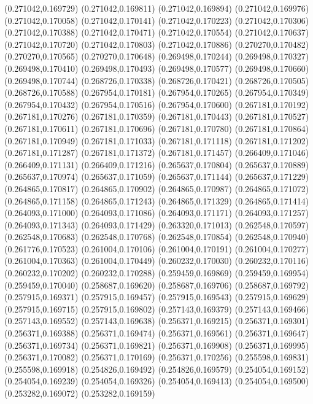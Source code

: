 (0.271042,0.169729)
(0.271042,0.169811)
(0.271042,0.169894)
(0.271042,0.169976)
(0.271042,0.170058)
(0.271042,0.170141)
(0.271042,0.170223)
(0.271042,0.170306)
(0.271042,0.170388)
(0.271042,0.170471)
(0.271042,0.170554)
(0.271042,0.170637)
(0.271042,0.170720)
(0.271042,0.170803)
(0.271042,0.170886)
(0.270270,0.170482)
(0.270270,0.170565)
(0.270270,0.170648)
(0.269498,0.170244)
(0.269498,0.170327)
(0.269498,0.170410)
(0.269498,0.170493)
(0.269498,0.170577)
(0.269498,0.170660)
(0.269498,0.170744)
(0.268726,0.170338)
(0.268726,0.170421)
(0.268726,0.170505)
(0.268726,0.170588)
(0.267954,0.170181)
(0.267954,0.170265)
(0.267954,0.170349)
(0.267954,0.170432)
(0.267954,0.170516)
(0.267954,0.170600)
(0.267181,0.170192)
(0.267181,0.170276)
(0.267181,0.170359)
(0.267181,0.170443)
(0.267181,0.170527)
(0.267181,0.170611)
(0.267181,0.170696)
(0.267181,0.170780)
(0.267181,0.170864)
(0.267181,0.170949)
(0.267181,0.171033)
(0.267181,0.171118)
(0.267181,0.171202)
(0.267181,0.171287)
(0.267181,0.171372)
(0.267181,0.171457)
(0.266409,0.171046)
(0.266409,0.171131)
(0.266409,0.171216)
(0.265637,0.170804)
(0.265637,0.170889)
(0.265637,0.170974)
(0.265637,0.171059)
(0.265637,0.171144)
(0.265637,0.171229)
(0.264865,0.170817)
(0.264865,0.170902)
(0.264865,0.170987)
(0.264865,0.171072)
(0.264865,0.171158)
(0.264865,0.171243)
(0.264865,0.171329)
(0.264865,0.171414)
(0.264093,0.171000)
(0.264093,0.171086)
(0.264093,0.171171)
(0.264093,0.171257)
(0.264093,0.171343)
(0.264093,0.171429)
(0.263320,0.171013)
(0.262548,0.170597)
(0.262548,0.170683)
(0.262548,0.170768)
(0.262548,0.170854)
(0.262548,0.170940)
(0.261776,0.170523)
(0.261004,0.170106)
(0.261004,0.170191)
(0.261004,0.170277)
(0.261004,0.170363)
(0.261004,0.170449)
(0.260232,0.170030)
(0.260232,0.170116)
(0.260232,0.170202)
(0.260232,0.170288)
(0.259459,0.169869)
(0.259459,0.169954)
(0.259459,0.170040)
(0.258687,0.169620)
(0.258687,0.169706)
(0.258687,0.169792)
(0.257915,0.169371)
(0.257915,0.169457)
(0.257915,0.169543)
(0.257915,0.169629)
(0.257915,0.169715)
(0.257915,0.169802)
(0.257143,0.169379)
(0.257143,0.169466)
(0.257143,0.169552)
(0.257143,0.169638)
(0.256371,0.169215)
(0.256371,0.169301)
(0.256371,0.169388)
(0.256371,0.169474)
(0.256371,0.169561)
(0.256371,0.169647)
(0.256371,0.169734)
(0.256371,0.169821)
(0.256371,0.169908)
(0.256371,0.169995)
(0.256371,0.170082)
(0.256371,0.170169)
(0.256371,0.170256)
(0.255598,0.169831)
(0.255598,0.169918)
(0.254826,0.169492)
(0.254826,0.169579)
(0.254054,0.169152)
(0.254054,0.169239)
(0.254054,0.169326)
(0.254054,0.169413)
(0.254054,0.169500)
(0.253282,0.169072)
(0.253282,0.169159)
